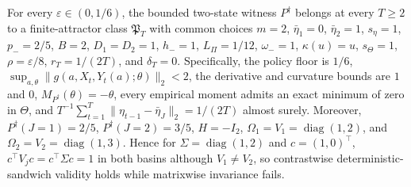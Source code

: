 For every \(\varepsilon\in(0,1/6)\), the bounded two-state witness \(P^{\dagger}\) belongs at every \(T\ge2\) to a finite-attractor class \(\mathfrak P_T\) with common choices \(m=2\), \(\bar\eta_1=0\), \(\bar\eta_2=1\), \(s_\eta=1\), \(p_-=2/5\), \(B=2\), \(D_1=D_2=1\), \(h_-=1\), \(L_\Pi=1/12\), \(\omega_-=1\), \(\kappa(u)=u\), \(s_\Theta=1\), \(\rho=\varepsilon/8\), \(r_T=1/(2T)\), and \(\delta_T=0\). Specifically, the policy floor is \(1/6\), \(\sup_{a,\theta}\|g(a,X_t,Y_t(a);\theta)\|_2<2\), the derivative and curvature bounds are \(1\) and \(0\), \(M_{P^{\dagger}}(\theta)=-\theta\), every empirical moment admits an exact minimum of zero in \(\Theta\), and \(T^{-1}\sum_{t=1}^T\|\eta_{t-1}-\bar\eta_J\|_2=1/(2T)\) almost surely. Moreover, \(P^{\dagger}(J=1)=2/5\), \(P^{\dagger}(J=2)=3/5\), \(H=-I_2\), \(\Omega_1=V_1=\operatorname{diag}(1,2)\), and \(\Omega_2=V_2=\operatorname{diag}(1,3)\). Hence for \(\Sigma=\operatorname{diag}(1,2)\) and \(c=(1,0)^\top\), \(c^\top V_jc=c^\top\Sigma c=1\) in both basins although \(V_1\ne V_2\), so contrastwise deterministic-sandwich validity holds while matrixwise invariance fails.